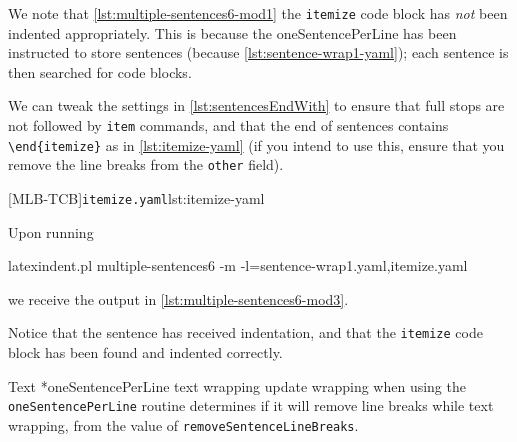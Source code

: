 

 We note that \cref{lst:multiple-sentences6-mod1} the \texttt{itemize} code block has
 \emph{not} been indented appropriately. This is because the oneSentencePerLine has been
 instructed to store sentences (because \cref{lst:sentence-wrap1-yaml}); each sentence is
 then searched for code blocks.

 We can tweak the settings in \vref{lst:sentencesEndWith} to ensure that full stops are
 not followed by \texttt{item} commands, and that the end of sentences contains
 \lstinline!\end{itemize}! as in \cref{lst:itemize-yaml} (if you intend to use this,
 ensure that you remove the line breaks from the \texttt{other} field).  
  

 [MLB-TCB]{\texttt{itemize.yaml}}{lst:itemize-yaml}

 Upon running  
 \begin{commandshell}
latexindent.pl multiple-sentences6 -m -l=sentence-wrap1.yaml,itemize.yaml
\end{commandshell}
 we receive the output in \cref{lst:multiple-sentences6-mod3}.


 Notice that the sentence has received indentation, and that the \texttt{itemize} code
 block has been found and indented correctly.

 Text *{oneSentencePerLine text wrapping update} wrapping when using
 the \texttt{oneSentencePerLine} routine determines if it will remove line breaks while
 text wrapping, from the value of \texttt{removeSentenceLineBreaks}.
